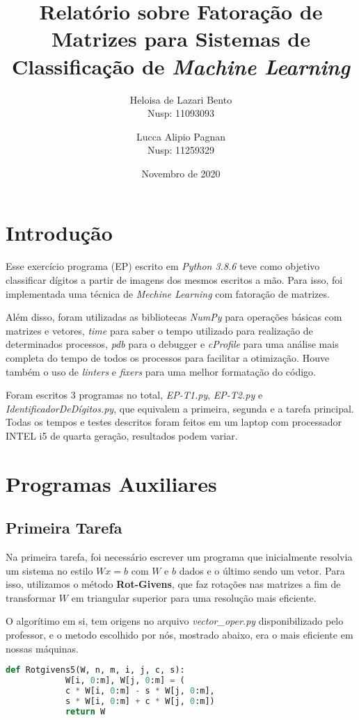 \documentclass[a4paper, 12pt]{article}
\title{Relatório sobre Fatoração de Matrizes para Sistemas de Classificação de \textit{Machine Learning}}
\author{Heloisa de Lazari Bento \\ Nusp: 11093093 \and Lucca Alipio Pagnan \\ Nusp: 11259329}
\date{Novembro de 2020}
\begin{document}
\maketitle

\section{Introdução}

    Esse exercício programa (EP) escrito em \textit{Python 3.8.6} teve como objetivo classificar dígitos a partir de imagens dos mesmos escritos a mão.
    Para isso, foi implementada uma técnica de \textit{Mechine Learning} com fatoração de matrizes.

    Além disso, foram utilizadas as bibliotecas \textit{NumPy} para operações básicas com matrizes e vetores, \textit{time} para saber o tempo utilizado para realização de determinados processos, \textit{pdb} para o debugger e \textit{cProfile} para uma análise mais completa do tempo de todos os processos para facilitar a otimização.
    Houve também o uso de \textit{linters} e \textit{fixers} para uma melhor formatação do código.

    Foram escritos 3 programas no total, \textit{EP-T1.py}, \textit{EP-T2.py} e \textit{IdentificadorDeDígitos.py}, que equivalem a primeira, segunda e a tarefa principal.
    Todas os tempos e testes descritos foram feitos em um laptop com processador INTEL i5 de quarta geração, resultados podem variar.

\section{Programas Auxiliares}

\subsection{Primeira Tarefa}

    Na primeira tarefa, foi necessário escrever um programa que inicialmente resolvia um sistema no estilo  $Wx = b$ com  $W$ e $b$ dados e o último sendo um vetor.
    Para isso, utilizamos o método \textbf{Rot-Givens}, que faz rotações nas matrizes a fim de transformar $W$ em triangular superior para uma resolução mais eficiente.

    O algorítimo em si, tem origens no arquivo \textit{vector\_oper.py} disponibilizado pelo professor, e o metodo escolhido por nós, mostrado abaixo, era o mais eficiente em nossas máquinas.
    \begin{lstlisting}[language=Python]
        def Rotgivens5(W, n, m, i, j, c, s):
            W[i, 0:m], W[j, 0:m] = (
            c * W[i, 0:m] - s * W[j, 0:m],
            s * W[i, 0:m] + c * W[j, 0:m])
            return W
    \end{lstlisting}
\end{document}
